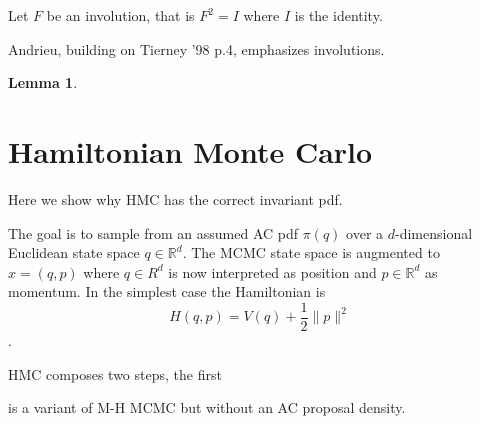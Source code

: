 \documentclass[10pt]{article}
\newcommand{\R}{\mathbb{R}}
\newtheorem{lem}[thm]{Lemma}
\begin{document}
Let $F$ be an involution,
  that is $F^2=I$ where $I$ is the identity.

Andrieu, building on Tierney '98 p.4, emphasizes involutions.


\begin{lem}


\end{lem}

\section{Hamiltonian Monte Carlo}

Here we show why HMC has the correct invariant pdf.


The goal is to sample from an assumed AC pdf $\pi(q)$ over a $d$-dimensional
Euclidean state space $q\in \R^d$.
The MCMC state space is augmented to $x = (q,p)$ where $q\in R^d$ is now interpreted
as position and $p\in\R^d$ as momentum.
In the simplest case the Hamiltonian is
$$
H(q,p) = V(q) + \frac{1}{2}\|p\|^2
$$.



HMC composes two steps, the first 

is a variant of M-H MCMC but without an AC proposal density.









\end{document}
